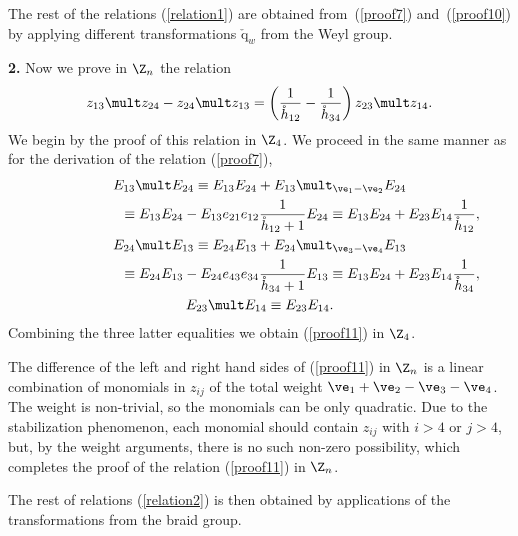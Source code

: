 \documentclass[pdftex]{sigma}
\def\nplus{\mathfrak{n}}\def\nn{\nonumber}\def\nin{\noindent}
\def\q{\check{\mathrm q}}\def\Q{\mathrm{Q}}\def\r#1{(\ref{#1})}\let\rf=\r
\def\s{z}\def\S{\mathrm {S}}\def\si{\sigma}\def\Sp{\S^{\nplus}}\def\sy{\acute{\sigma}}\def\th{\mathring{h}}
\numberwithin{equation}{section}
\begin{document}
The rest of the relations \rf{relation1} are obtained from~\rf{proof7} and~\rf{proof10}
by applying dif\/ferent transformations $\q_w$ from the Weyl group.

{\bf 2.} Now we prove in $\Z_n$ the relation
\begin{gather}\label{proof11}
\s_{13}\mult\s_{24}-\s_{24}\mult\s_{13}=
\left(\frac{1}{\th_{12}}-\frac{1}{\th_{34}}\right)\s_{23}\mult\s_{14}  .
\end{gather}
We begin by the proof of this relation in $\Z_4$. We proceed in the same manner as for the derivation of the
relation (\ref{proof7}),
\begin{gather*}E_{13}\mult E_{24}\equiv E_{13}E_{24}+E_{13}\mult_{\ve_1-\ve_2} E_{24} \\
\phantom{E_{13}\mult E_{24}}{} \equiv
E_{13}E_{24}-E_{13}e_{21}e_{12}  \frac{1}{\th_{12}+1} E_{24}
 \equiv E_{13}E_{24}+E_{23}E_{14} \frac{1}{\th_{12}}  ,\\
 E_{24}\mult E_{13}\equiv E_{24}E_{13}+E_{24}\mult_{\ve_3-\ve_4} E_{13}\\
 \phantom{E_{24}\mult E_{13}}{}  \equiv
E_{24}E_{13}-E_{24}e_{43}e_{34}  \frac{1}{\th_{34}+1} E_{13} \equiv E_{13}E_{24}+E_{23}E_{14}  \frac{1}{\th_{34}}  ,\\
 E_{23}\mult E_{14} \equiv E_{23}E_{14}  .
 \end{gather*}
Combining the three latter equalities we obtain \rf{proof11} in $\Z_4$.


The dif\/ference of the left and right hand sides of \rf{proof11} in $\Z_n$ is a linear combination of monomials in $\s_{ij}$ of
the total weight $\ve_1+\ve_2-\ve_3-\ve_4$. The weight is non-trivial, so the monomials can be only quadratic.
Due to the stabilization phenomenon, each monomial should contain $\s_{ij}$ with $i>4$ or $j>4$, but, by the weight arguments,
there is no such non-zero possibility, which completes the proof of the relation \rf{proof11} in $\Z_n$.


The rest of relations \rf{relation2} is then obtained by applications of the transformations from the braid group.
\end{document}
